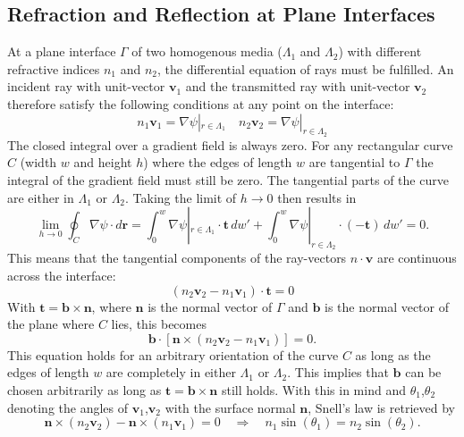 \subsection{Refraction and Reflection at Plane Interfaces}
At a plane interface \(\Gamma \) of two homogenous media (\(\Lambda_1\) and \(\Lambda_2\)) with different refractive indices \(n_1\) and \(n_2\), the differential equation of rays must be fulfilled.
An incident ray with unit-vector \(\bm{v}_1\) and the transmitted ray with unit-vector \(\bm{v}_2\) therefore satisfy the following conditions at any point on the interface:
\begin{equation}
    n_1 \bm{v}_1 = \nabla \psi|_{r \in \Lambda_1 } \quad n_2 \bm{v}_2 = \nabla \psi|_{r \in \Lambda_2 } 
\end{equation}
The closed integral over a gradient field is always zero.
For any rectangular curve \(C\) (width \(w\) and height \(h\)) where the edges of length \(w\) are tangential to \(\Gamma \) the integral of the gradient field must still be zero.
The tangential parts of the curve are either in \(\Lambda_1\) or \(\Lambda_2\).
Taking the limit of \(h \to 0\) then results in~\parencite{born_foundations_1999}
\begin{equation}
    \lim_{h \to 0} \oint_C \nabla \psi \cdot d\bm{r} = \int_{0}^{w} \nabla \psi|_{r \in \Lambda_1 } \cdot \bm{t} \, dw' + \int_{0}^{w} \nabla \psi|_{r \in \Lambda_2 } \cdot (-\bm{t}) \, dw' = 0.
\end{equation}
This means that the tangential components of the ray-vectors \(n \cdot \bm{v}\) are continuous across the interface:
\begin{equation}
    (n_2 \bm{v}_2 - n_1 \bm{v}_1) \cdot \bm{t} = 0
\end{equation}
With \(\bm{t} = \bm{b} \times \bm{n}\), where \(\bm{n}\) is the normal vector of \(\Gamma \) and \(\bm{b}\) is the normal vector of the plane where \(C\) lies, this becomes
\begin{equation}
    \bm{b} \cdot [\bm{n} \times (n_2 \bm{v}_2 - n_1 \bm{v}_1)] = 0.
\end{equation}
This equation holds for an arbitrary orientation of the curve \(C\) as long as the edges of length \(w\) are completely in either \(\Lambda_1\) or \(\Lambda_2\).
This implies that \(\bm{b}\) can be chosen arbitrarily as long as \(\bm{t} = \bm{b} \times \bm{n}\) still holds.
With this in mind and \(\theta_1\),\(\theta_2\) denoting the angles of \(\bm{v}_1\),\(\bm{v}_2\) with the surface normal \(\bm{n}\), Snell's law is retrieved by
\begin{equation}
    \bm{n} \times (n_2\bm{v}_2) - \bm{n} \times (n_1\bm{v}_1) = 0 \quad \Rightarrow \quad n_1 \sin(\theta_1) = n_2 \sin(\theta_2).
\end{equation}

